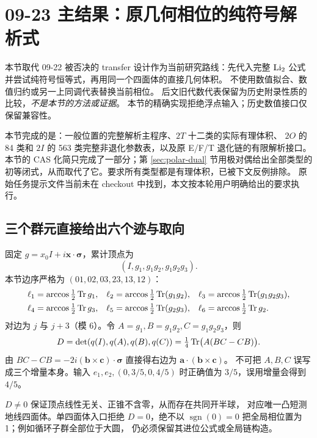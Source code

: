 \section{09-23 主结果：原几何相位的纯符号解析式}
\label{sec:symbolic-ade}

本节取代 09-22 被否决的 transfer 设计作为当前研究路线：先代入完整
$\operatorname{Li}_2$ 公式并尝试纯符号恒等式，再用同一个四面体的直接几何体积。
不使用数值拟合、数值归约或另一上同调代表替换当前相位。
后文旧代数代表保留为历史附录性质的比较，\emph{不是本节的方法或证据}。
本节的精确实现拒绝浮点输入；历史数值接口仅保留兼容性。

本节完成的是：一般位置的完整解析主程序、$2T$ 十二类的实际有理体积、
$2O$ 的 84 类和 $2I$ 的 563 类完整非退化参数表，以及原 E/F/T
退化链的有限解析接口。本节的 CAS 化简只完成了一部分；第 \ref{sec:polar-dual} 节用极对偶给出全部类型的初等闭式，从而取代了它。要求所有类型都是有理体积，已被下文反例排除。
原始任务提示文件当前未在 checkout 中找到，本文按本轮用户明确给出的要求执行。

\subsection{三个群元直接给出六个迹与取向}

固定 $g=x_0I+i\boldsymbol{x}\cdot\boldsymbol{\sigma}$，累计顶点为
\[
(I,g_1,g_1g_2,g_1g_2g_3).
\]
本节边序严格为 $(01,02,03,23,13,12)$：
\begin{align}
\ell_1&=\arccos\tfrac12\operatorname{Tr} g_1,&
\ell_2&=\arccos\tfrac12\operatorname{Tr}(g_1g_2),&
\ell_3&=\arccos\tfrac12\operatorname{Tr}(g_1g_2g_3),\\
\ell_4&=\arccos\tfrac12\operatorname{Tr} g_3,&
\ell_5&=\arccos\tfrac12\operatorname{Tr}(g_2g_3),&
\ell_6&=\arccos\tfrac12\operatorname{Tr} g_2.
\end{align}
对边为 $j$ 与 $j+3$（模 6）。令 $A=g_1,B=g_1g_2,C=g_1g_2g_3$，则
\begin{equation}
 D=\det(q(I),q(A),q(B),q(C))=\tfrac14\operatorname{Tr}\bigl(A(BC-CB)\bigr).
 \label{eq:exact-orientation}
\end{equation}
由 $BC-CB=-2i(\boldsymbol b\times\boldsymbol c)\cdot\boldsymbol\sigma$
直接得右边为 $\boldsymbol a\cdot(\boldsymbol b\times\boldsymbol c)$。
不可把 $A,B,C$ 误写成三个增量本身。输入
$e_1,e_2,(0,3/5,0,4/5)$ 时正确值为 $3/5$，误用增量会得到 $4/5$。

$D\ne0$ 保证顶点线性无关、正锥不含零，从而存在共同开半球，
对应唯一凸短测地线四面体。单四面体入口拒绝 $D=0$，绝不以
$\operatorname{sgn}(0)=0$ 把全局相位置为 1；例如循环子群全部位于大圆，
仍必须保留其进位公式或全局链构造。

